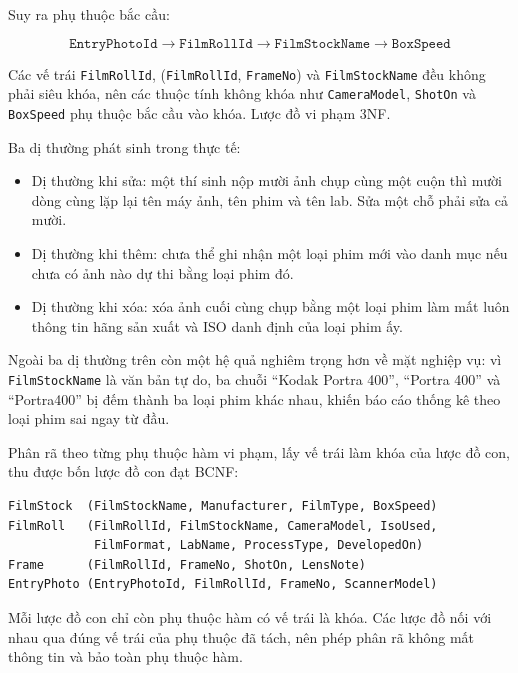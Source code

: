 Suy ra phụ thuộc bắc cầu:

\[ \texttt{EntryPhotoId} \rightarrow \texttt{FilmRollId} \rightarrow \texttt{FilmStockName} \rightarrow \texttt{BoxSpeed} \]

Các vế trái \texttt{FilmRollId}, (\texttt{FilmRollId}, \texttt{FrameNo}) và \texttt{FilmStockName} đều không phải siêu khóa, nên các thuộc tính không khóa như \texttt{CameraModel}, \texttt{ShotOn} và \texttt{BoxSpeed} phụ thuộc bắc cầu vào khóa. Lược đồ vi phạm 3NF.

Ba dị thường phát sinh trong thực tế:


\begin{itemize}
    \item Dị thường khi sửa: một thí sinh nộp mười ảnh chụp cùng một cuộn thì mười dòng cùng lặp lại tên máy ảnh, tên phim và tên lab. Sửa một chỗ phải sửa cả mười.
    \item Dị thường khi thêm: chưa thể ghi nhận một loại phim mới vào danh mục nếu chưa có ảnh nào dự thi bằng loại phim đó.
    \item Dị thường khi xóa: xóa ảnh cuối cùng chụp bằng một loại phim làm mất luôn thông tin hãng sản xuất và ISO danh định của loại phim ấy.
\end{itemize}


Ngoài ba dị thường trên còn một hệ quả nghiêm trọng hơn về mặt nghiệp vụ: vì \texttt{FilmStockName} là văn bản tự do, ba chuỗi \textquotedblleft Kodak Portra 400\textquotedblright{}, \textquotedblleft Portra 400\textquotedblright{} và \textquotedblleft \mbox{Portra400}\textquotedblright{} bị đếm thành ba loại phim khác nhau, khiến báo cáo thống kê theo loại phim sai ngay từ đầu.

Phân rã theo từng phụ thuộc hàm vi phạm, lấy vế trái làm khóa của lược đồ con, thu được bốn lược đồ con đạt BCNF:


\begin{lstlisting}[style=sqlstyle]
FilmStock  (FilmStockName, Manufacturer, FilmType, BoxSpeed)
FilmRoll   (FilmRollId, FilmStockName, CameraModel, IsoUsed,
            FilmFormat, LabName, ProcessType, DevelopedOn)
Frame      (FilmRollId, FrameNo, ShotOn, LensNote)
EntryPhoto (EntryPhotoId, FilmRollId, FrameNo, ScannerModel)
\end{lstlisting}


Mỗi lược đồ con chỉ còn phụ thuộc hàm có vế trái là khóa. Các lược đồ nối với nhau qua đúng vế trái của phụ thuộc đã tách, nên phép phân rã không mất thông tin và bảo toàn phụ thuộc hàm.

